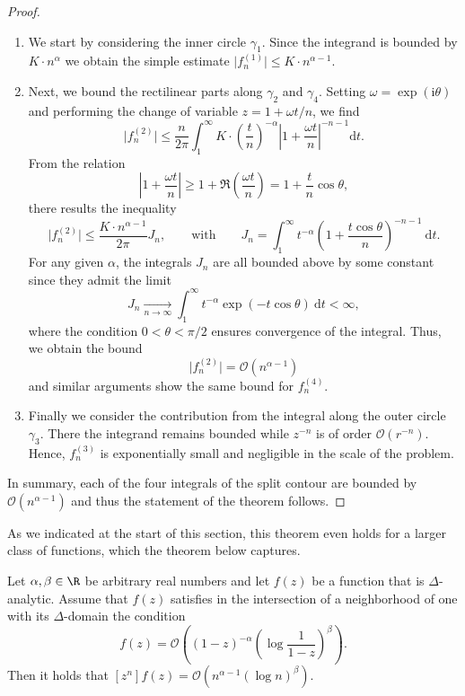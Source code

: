 \begin{proof}
  \begin{enumerate}
    \item We start by considering the inner circle $\gamma_1$. Since the integrand is bounded by $K \cdot n^\alpha$ we obtain the simple estimate $\big|f_n^{(1)}\big| \leq K \cdot n^{\alpha - 1}$.
    \item Next, we bound the rectilinear parts along $\gamma_2$ and $\gamma_4$. Setting $\omega = \exp(\mathrm{i} \theta)$ and performing the change of variable $z = 1 + \omega t / n$, we find
    $$
      \big|f_n^{(2)}\big| \leq \frac{n}{2\pi} \int_1^\infty K \cdot \left(\frac{t}{n}\right)^{-\alpha} \left| 1 + \frac{\omega t}{n}\right|^{-n-1} \mathrm{d}t.
    $$
    From the relation
    $$
      \left|1 + \frac{\omega t}{n} \right| \geq 1 + \mathfrak{R}\left(\frac{\omega t}{n}\right) = 1 + \frac{t}{n} \cos \theta,
    $$
    there results the inequality
    $$
      \big| f_n^{(2)}\big| \leq \frac{K \cdot n^{\alpha - 1}}{2 \pi} J_n, \qquad \text{with} \qquad J_n = \int_1^\infty t^{-\alpha}\left(1 + \frac{t \cos \theta}{n}\right)^{-n-1} ~\mathrm{d}t.
    $$
    For any given $\alpha$, the integrals $J_n$ are all bounded above by some constant since they admit the limit
    $$
      J_n \xrightarrow[n \to \infty]{} \int_1^\infty t^{-\alpha} \exp(-t \cos \theta) ~\mathrm{d}t < \infty,
    $$
    where the condition $0 < \theta < \pi/2$ ensures convergence of the integral. Thus, we obtain the bound
    $$
       \big| f_n^{(2)} \big| = \mathcal{O}(n^{\alpha - 1})
    $$
    and similar arguments show the same bound for $f_n^{(4)}$.
    \item Finally we consider the contribution from the integral along the outer circle $\gamma_3$. There the integrand remains bounded while $z^{-n}$ is of order $\mathcal{O}(r^{-n})$. Hence, $f_n^{(3)}$ is exponentially small and negligible in the scale of the problem.
  \end{enumerate}

  In summary, each of the four integrals of the split contour are bounded by $\mathcal{O}\left(n^{\alpha - 1}\right)$ and thus the statement of the theorem follows.
\end{proof}

As we indicated at the start of this section, this theorem even holds for a larger class of functions, which the theorem below captures.

\begin{theorem}
  Let $\alpha, \beta \in \R$ be arbitrary real numbers and let $f(z)$ be a function that is $\Delta$-analytic. Assume that $f(z)$ satisfies in the intersection of a neighborhood of one with its $\Delta$-domain the condition   
  $$
    f(z) = \mathcal{O}\left((1-z)^{-\alpha} \left( \log \frac{1}{1-z}\right)^\beta\right).
  $$
  Then it holds that $[z^n]f(z) = \mathcal{O}(n^{\alpha-1}(\log n)^\beta).$
\end{theorem}

